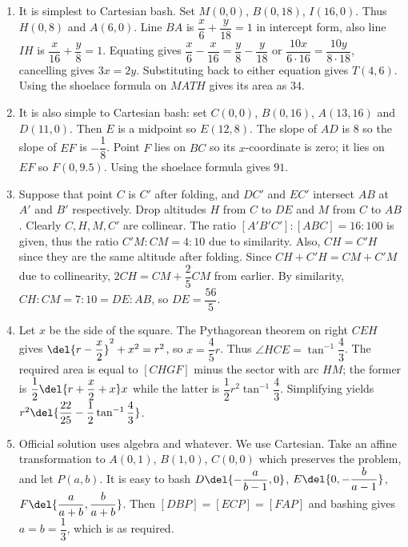 \documentclass[10pt,paper=letter]{scrartcl}
\begin{document}
\begin{enumerate}
\item It is simplest to Cartesian bash. Set $M(0, 0)$, $B(0, 18)$, $I(16, 0)$. Thus $H(0, 8)$ and $A(6, 0)$. Line $BA$ is $\dfrac{x}6 + \dfrac{y}{18} = 1$ in intercept form, also line $IH$ is $\dfrac{x}{16} + \dfrac{y}8 = 1$. Equating gives $\dfrac{x}6 - \dfrac{x}{16} = \dfrac{y}8 - \dfrac{y}{18}$ or $\dfrac{10x}{6 \cdot 16} = \dfrac{10y}{8 \cdot 18}$, cancelling gives $3x = 2y$. Substituting back to either equation gives $T(4, 6)$. Using the shoelace formula on $MATH$ gives its area as $34$.

\item It is also simple to Cartesian bash: set $C(0, 0)$, $B(0, 16)$, $A(13, 16)$ and $D(11, 0)$. Then $E$ is a midpoint so $E(12, 8)$. The slope of $AD$ is $8$ so the slope of $EF$ is $-\dfrac18$. Point $F$ lies on $BC$ so its $x$-coordinate is zero; it lies on $EF$ so $F(0, 9.5)$. Using the shoelace formula gives $91$.

\item Suppose that point $C$ is $C'$ after folding, and $DC'$ and $EC'$ intersect $AB$ at $A'$ and $B'$ respectively. Drop altitudes $H$ from $C$ to $DE$ and $M$ from $C$ to $AB$. Clearly $C, H, M, C'$ are collinear. The ratio $[A'B'C'] : [ABC] = 16 : 100$ is given, thus the ratio $C'M : CM = 4 : 10$ due to similarity. Also, $CH = C'H$ since they are the same altitude after folding. Since $CH + C'H = CM + C'M$ due to collinearity, $2CH = CM + \dfrac25CM$ from earlier. By similarity, $CH : CM = 7 : 10 = DE : AB$, so $DE = \dfrac{56}5$.

\item Let $x$ be the side of the square. The Pythagorean theorem on right $CEH$ gives $\del{r - \dfrac{x}2}^2 + x^2 = r^2$, so $x = \dfrac45 r$. Thus $\angle HCE = \tan^{-1}\dfrac43$. The required area is equal to $[CHGF]$ minus the sector with arc $HM$; the former is $\dfrac12\del{r + \dfrac{x}2 + x} x$ while the latter is $\dfrac12 r^2 \tan^{-1}\dfrac43$. Simplifying yields $r^2 \del{\dfrac{22}{25} - \dfrac12 \tan^{-1}\dfrac43}$.

\item Official solution uses algebra and whatever. We use Cartesian. Take an affine transformation to $A(0, 1)$, $B(1, 0)$, $C(0, 0)$ which preserves the problem, and let $P(a, b)$. It is easy to bash $D\del{-\dfrac{a}{b-1}, 0}$, $E\del{0, -\dfrac{b}{a-1}}$, $F\del{\dfrac{a}{a+b}, \dfrac{b}{a+b}}$. Then $[DBP] = [ECP] = [FAP]$ and bashing gives $a = b = \dfrac13$, which is as required.

\end{enumerate}
\end{document}

